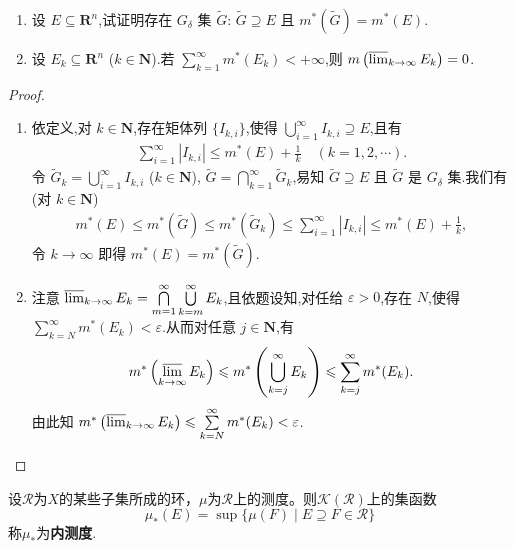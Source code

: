 \documentclass[../../main.tex]{subfiles}%
\begin{document}
\begin{proposition}
\begin{enumerate}[(1)]
\item 设 $E\subseteq\mathbf{R}^n$,试证明存在 $G_\delta$ 集 $\widetilde{G}$: $\widetilde{G}\supseteq E$ 且 $m^*(\widetilde{G})=m^*(E)$.

\item 设 $E_k\subseteq\mathbf{R}^n$ ($k\in\mathbf{N}$).若 $\sum\limits_{k=1}^{\infty}m^*(E_k)<+\infty$,则 $m\left(\varlimsup_{k\to\infty}E_k\right)=0$.
\end{enumerate}
\end{proposition}
\begin{proof}
\begin{enumerate}[(1)]
\item 依定义,对 $k\in\mathbf{N}$,存在矩体列 $\{I_{k,i}\}$,使得 $\bigcup\limits_{i=1}^{\infty}I_{k,i}\supseteq E$,且有
\begin{align*}
\sum\limits_{i=1}^{\infty}|I_{k,i}|\leqslant m^*(E)+\frac{1}{k}\quad (k=1,2,\cdots).
\end{align*}
令 $\widetilde{G}_k=\bigcup\limits_{i=1}^{\infty}I_{k,i}$ ($k\in\mathbf{N}$), $\widetilde{G}=\bigcap\limits_{k=1}^{\infty}\widetilde{G}_k$,易知 $\widetilde{G}\supseteq E$ 且 $\widetilde{G}$ 是 $G_\delta$ 集.我们有(对 $k\in\mathbf{N}$)
\begin{align*}
m^*(E)\leqslant m^*(\widetilde{G})\leqslant m^*(\widetilde{G}_k)\leqslant \sum\limits_{i=1}^{\infty}|I_{k,i}|\leqslant m^*(E)+\frac{1}{k},
\end{align*}
令 $k\to\infty$ 即得 $m^*(E)=m^*(\widetilde{G})$.
\item 注意 $\varlimsup_{k\to\infty}E_k=\bigcap\limits_{m=1}^{\infty}\bigcup\limits_{k=m}^{\infty}E_k$,且依题设知,对任给 $\varepsilon>0$,存在 $N$,使得 $\sum\limits_{k=N}^{\infty}m^*(E_k)<\varepsilon$.从而对任意 $j\in\mathbf{N}$,有
\begin{align*}
m^*\left(\varlimsup_{k\to\infty}E_k\right)\leqslant m^*\left(\bigcup\limits_{k=j}^{\infty}E_k\right)\leqslant \sum\limits_{k=j}^{\infty}m^*(E_k).
\end{align*}
由此知 $m^*\left(\varlimsup_{k\to\infty}E_k\right)\leqslant \sum\limits_{k=N}^{\infty}m^*(E_k)<\varepsilon$.
\end{enumerate}
\end{proof}

\begin{definition}[内测度]
设$\mathscr{R}$为$X$的某些子集所成的环，$\mu$为$\mathscr{R}$上的测度。则$\mathscr{K}(\mathscr{R})$上的集函数
\[
\mu_*(E) = \sup\{\mu(F) \mid E \supseteq F \in \mathscr{R}\}
\]
称$\mu_*$为\textbf{内测度}.
\end{definition}
\end{document}
